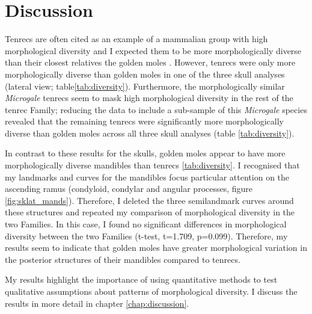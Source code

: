 
\section{Discussion}



	Tenrecs are often cited as an example of a mammalian group with high morphological diversity \citep{Olson2013, Soarimalala2011, Eisenberg1969} and I expected them to be more morphologically diverse than their closest relatives the golden moles . However, tenrecs were only more morphologically diverse than golden moles in one of the three skull analyses (lateral view; table\ref{tab:diversity}). Furthermore, the morphologically similar \textit{Microgale} tenrecs seem to mask high morphological diversity in the rest of the tenrec Family; reducing the data to include a sub-sample of this \textit{Microgale} species revealed that the remaining tenrecs were significantly more morphologically diverse than golden moles across all three skull analyses (table \ref{tab:diversity}). 
	
	In contrast to these results for the skulls, golden moles appear to have more morphologically diverse mandibles than tenrecs \ref{tab:diversity}.
	I recognised that my landmarks and curves for the mandibles focus particular attention on the ascending ramus (condyloid, condylar and angular processes, figure \ref{fig:sklat_mands}). Therefore, I  deleted the three semilandmark curves around these structures and repeated my comparison of morphological diversity in the two Families. In this case, I found no significant differences in morphological diversity between the two Families (t-test, t=1.709, p=0.099). Therefore, my results seem to indicate that golden moles have greater morphological variation in the posterior structures of their mandibles compared to tenrecs.
	
	My results highlight the importance of using quantitative methods to test qualitative assumptions about patterns of morphological diversity. I discuss the results in more detail in chapter \ref{chap:discussion}.





